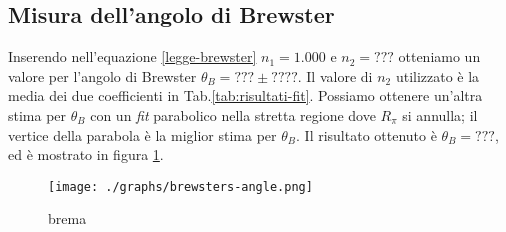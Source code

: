 \subsection{Misura dell'angolo di Brewster}\label{subsec:angolo-di-brewster}
  Inserendo nell'equazione \eqref{legge-brewster} $n_1 = 1.000$ e $n_2 = ???$ %
  otteniamo un valore per l'angolo di Brewster $\theta_B = ??? \pm ????$. Il valore di $n_2$ utilizzato è la media
  dei due coefficienti in Tab.\ref{tab:risultati-fit}.
  Possiamo ottenere un'altra stima per $\theta_B$ con un \emph{fit} parabolico nella stretta regione
  dove $R_\pi$ si annulla; il vertice della parabola è la miglior stima per $\theta_B$.
  Il risultato ottenuto è $\theta_B = ???$, ed è mostrato in figura \ref{fig:brewsters-angle}. %
  \begin{figure}[h]
    \centering
    \caption{brema}
    \texttt{[image: ./graphs/brewsters-angle.png]}
    \label{fig:brewsters-angle}
  \end{figure}
\endinput



